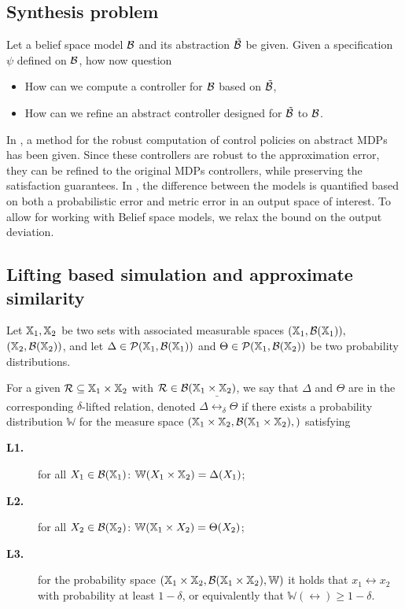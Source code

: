 \documentclass{ifacconf}
\begin{document}
\subsection{Synthesis problem}
Let a belief space model $\mathcal{B}$ and its abstraction $\tilde {\mathcal{B}}$ be given.  Given a specification $\psi$ defined on $\mathcal{B}$, how now question
\begin{itemize}
	\item How can we compute a controller for $\mathcal{B}$ based on $\tilde {\mathcal{B}}$,
	\item How can we refine an abstract controller designed for $\tilde{\mathcal{B}}$ to $\mathcal{B}$.
\end{itemize}

In \citet{tech_report_TACAS}, a method for the robust computation of control policies on abstract MDPs has been given.  Since these controllers are robust to the approximation error,  they can be refined to the original MDPs controllers, while preserving the satisfaction guarantees. 
In \citet{tech_report_TACAS}, the difference between the models is quantified based on both a probabilistic error and metric error in an output space of interest. 
To allow for working with Belief space models, we relax the bound on the output deviation.


\subsection{Lifting based simulation  and approximate similarity}

	Let ${\mathbb{X}}_1,{\mathbb{X}}_2$ be two sets with associated measurable spaces $({\mathbb{X}}_1,\mathcal B({\mathbb{X}}_1)),$ $({\mathbb{X}}_2,\mathcal B({\mathbb{X}}_2))$,
	and let   $\Delta\in \mathcal{P}({\mathbb{X}}_1,\mathcal B({\mathbb{X}}_1)) $ and  $\Theta\in \mathcal{P}({\mathbb{X}}_1,\mathcal B({\mathbb{X}}_2)) $ be two probability distributions. 
	
For a given 
	$\mathcal{R}\subseteq {\mathbb{X}}_1\times {\mathbb{X}}_2$ with $\mathcal{R}\in \mathcal B({\mathbb{X}}_1\times {\mathbb{X}}_2)$, we say that  $\Delta$ and $ \Theta$ are in the corresponding $\delta$-lifted relation, denoted $\Delta \bar \rel_\delta \Theta$  if there exists a probability distribution $\mathbb W$ for the measure space $({\mathbb{X}}_1\times {\mathbb{X}}_2,\mathcal B({\mathbb{X}}_1\times {\mathbb{X}}_2),)$
	satisfying { \setlength{\parskip}{-1pt}\setlength{\parsep}{0pt}
		\begin{description}
			\item[\textbf{L1.}] for all $X_1\in \mathcal{B}({\mathbb{X}}_1)$: $\mathbb W(X_1\times {\mathbb{X}}_2)=\Delta(X_1)$;
			\item [\textbf{L2.}] for all $X_2\in \mathcal{B}({\mathbb{X}}_2)$:  $\mathbb W({\mathbb{X}}_1\times X_2)=\Theta(X_2)$;
			\item[\textbf{L3.}] for the probability space  $({\mathbb{X}}_1\times {\mathbb{X}}_2,\mathcal B({\mathbb{X}}_1\times {\mathbb{X}}_2), \mathbb W)$ it holds that
			$x_1\rel x_2$ with probability at least $1-\delta$, or equivalently that $\mathbb{W}\left(\rel\right)\geq1-\delta$.
	\end{description}}%
	
\end{document}
